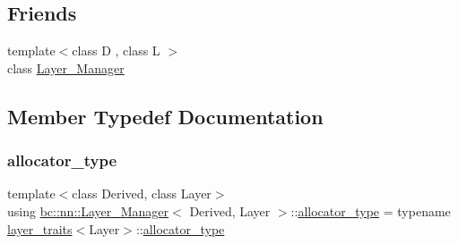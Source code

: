 \subsection*{Friends}
\begin{DoxyCompactItemize}
\item 
{\footnotesize template$<$class D , class L $>$ }\\class \hyperlink{structbc_1_1nn_1_1Layer__Manager_ad8aa8062ca6d04ccdeff27cf28c1eb4e}{Layer\+\_\+\+Manager}
\end{DoxyCompactItemize}


\subsection{Member Typedef Documentation}
\mbox{\label{structbc_1_1nn_1_1Layer__Manager_a6618b1c4afdad0eafd781b319f27f230}} 
\subsubsection{\texorpdfstring{allocator\+\_\+type}{allocator\_type}}
{\footnotesize\ttfamily template$<$class Derived, class Layer$>$ \\
using \hyperlink{structbc_1_1nn_1_1Layer__Manager}{bc\+::nn\+::\+Layer\+\_\+\+Manager}$<$ Derived, Layer $>$\+::\hyperlink{structbc_1_1nn_1_1Layer__Manager_a6618b1c4afdad0eafd781b319f27f230}{allocator\+\_\+type} =  typename \hyperlink{structbc_1_1nn_1_1layer__traits}{layer\+\_\+traits}$<$Layer$>$\+::\hyperlink{structbc_1_1nn_1_1Layer__Manager_a6618b1c4afdad0eafd781b319f27f230}{allocator\+\_\+type}}

\mbox{\label{structbc_1_1nn_1_1Layer__Manager_a6e6cd6d324cc79ca740eea2f2438eccb}} 
